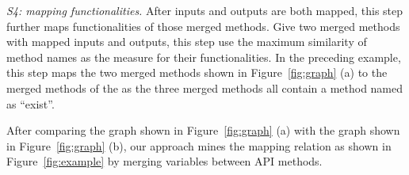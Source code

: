 \emph{S4: mapping functionalities.} After inputs and outputs are
both mapped, this step further maps functionalities of those merged
methods. Give two merged methods with mapped inputs and outputs,
this step use the maximum similarity of method names as the measure
for their functionalities. In the preceding example, this step maps
the two merged methods shown in Figure~\ref{fig:graph} (a) to the
merged methods of the  as the three
merged methods all contain a method named as ``exist''.

After comparing the graph shown in Figure~\ref{fig:graph} (a) with
the graph shown in Figure~\ref{fig:graph} (b), our approach mines
the mapping relation as shown in Figure~\ref{fig:example} by merging
variables between API methods.
